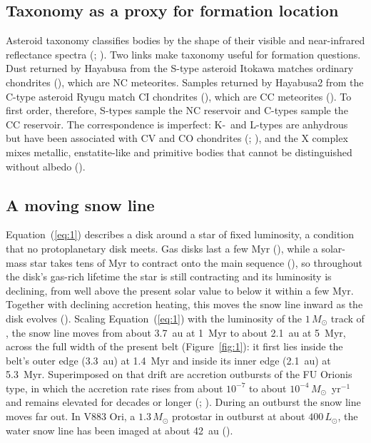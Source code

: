\documentclass[twocolumn]{aastex701}
\begin{document}
\subsection{Taxonomy as a proxy for formation location}\label{sec:2.1}
Asteroid taxonomy classifies bodies by the shape of their visible and near-infrared reflectance spectra (\citealt{bus2002}; \citealt{demeo2009}). Two links make taxonomy useful for formation questions. Dust returned by Hayabusa from the S-type asteroid Itokawa matches ordinary chondrites (\citealt{nakamura2011}), which are NC meteorites. Samples returned by Hayabusa2 from the C-type asteroid Ryugu match CI chondrites (\citealt{yokoyama2023}), which are CC meteorites (\citealt{kleine2020}). To first order, therefore, S-types sample the NC reservoir and C-types sample the CC reservoir. The correspondence is imperfect: \mbox{K-}~and L-types are anhydrous but have been associated with CV and CO chondrites (\citealt{sunshine2008}; \citealt{clark2009}), and the X complex mixes metallic, enstatite-like and primitive bodies that cannot be distinguished without albedo (\citealt{demeo2013}).

\subsection{A moving snow line}\label{sec:2.2}
Equation~(\ref{eq:1}) describes a disk around a star of fixed luminosity, a condition that no protoplanetary disk meets. Gas disks last a few Myr (\citealt{haisch2001}), while a solar-mass star takes tens of Myr to contract onto the main sequence (\citealt{baraffe2015}), so throughout the disk’s gas-rich lifetime the star is still contracting and its luminosity is declining, from well above the present solar value to below it within a few Myr. Together with declining accretion heating, this moves the snow line inward as the disk evolves (\citealt{kennedy2008}). Scaling Equation~(\ref{eq:1}) with the luminosity of the $1\,M_{\odot}$ track of \citet{baraffe2015}, the snow line moves from about 3.7~au at 1~Myr to about 2.1~au at 5~Myr, across the full width of the present belt (Figure~\ref{fig:1}): it first lies inside the belt’s outer edge (3.3~au) at 1.4~Myr and inside its inner edge (2.1~au) at 5.3~Myr. Superimposed on that drift are accretion outbursts of the FU Orionis type, in which the accretion rate rises from about $10^{-7}$ to about $10^{-4}\,M_{\odot}$~yr$^{-1}$ and remains elevated for decades or longer (\citealt{hartmann1996}; \citealt{audard2014}). During an outburst the snow line moves far out. In V883 Ori, a $1.3\,M_{\odot}$ protostar in outburst at about $400\,L_{\odot}$, the water snow line has been imaged at about 42~au (\citealt{cieza2016}).
\end{document}

